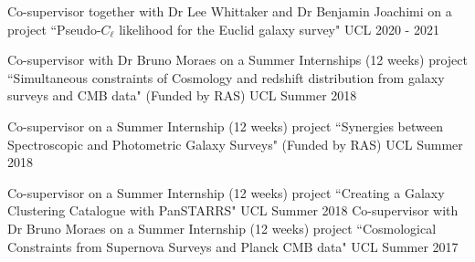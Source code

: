 \begin{cvhonors}

  
    {Co-supervisor together with Dr Lee Whittaker and Dr Benjamin Joachimi on a project ``Pseudo-$C_{\ell}$ likelihood for the Euclid galaxy survey"} %
    {UCL} %
    {2020 - 2021} %


    {Co-supervisor with Dr Bruno Moraes on a Summer Internships (12 weeks) project ``Simultaneous constraints of Cosmology and redshift distribution from galaxy surveys and CMB data" (Funded by RAS)} %
    {UCL} %
    {Summer 2018} 

    {Co-supervisor on a Summer Internship (12 weeks) project ``Synergies between Spectroscopic and Photometric Galaxy Surveys" (Funded by RAS)} %
    {UCL} %
    {Summer 2018} 

    {Co-supervisor on a Summer Internship (12 weeks) project ``Creating a Galaxy Clustering Catalogue with PanSTARRS"} %
    {UCL} %
    {Summer 2018}
\newpage
{} %
    {Co-supervisor with Dr Bruno Moraes on a Summer Internship (12 weeks) project ``Cosmological Constraints from Supernova Surveys and Planck CMB data"} %
    {UCL} %
    {Summer 2017} 

\end{cvhonors}